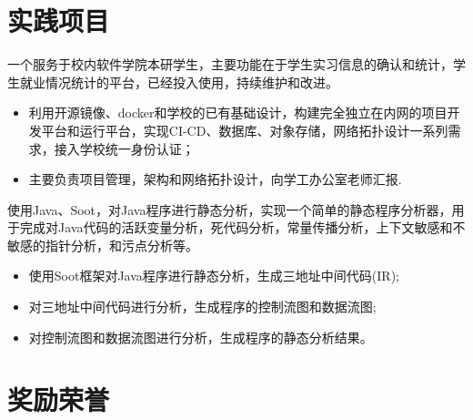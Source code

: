 \documentclass{resume}
\begin{document}
\section{实践项目}
\Contents
{一个服务于校内软件学院本研学生，主要功能在于学生实习信息的确认和统计，学生就业情况统计的平台，已经投入使用，持续维护和改进。}
{\begin{itemize}
    \item 利用开源镜像、docker和学校的已有基础设计，构建完全独立在内网的项目开发平台和运行平台，实现CI-CD、数据库、对象存储，网络拓扑设计一系列需求，接入学校统一身份认证；
    \item 主要负责项目管理，架构和网络拓扑设计，向学工办公室老师汇报.
\end{itemize}
}

\Contents
{使用Java、Soot，对Java程序进行静态分析，实现一个简单的静态程序分析器，用于完成对Java代码的活跃变量分析，死代码分析，常量传播分析，上下文敏感和不敏感的指针分析，和污点分析等。}
{\begin{itemize}
    \item 使用Soot框架对Java程序进行静态分析，生成三地址中间代码(IR);
    \item 对三地址中间代码进行分析，生成程序的控制流图和数据流图;
    \item 对控制流图和数据流图进行分析，生成程序的静态分析结果。
\end{itemize} }
\sepspace

\section{奖励荣誉}
\end{document}
